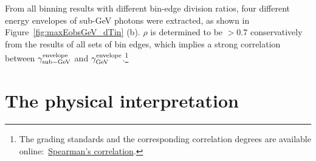 \documentclass[linenumbers,twocolumn]{aastex631}
\begin{document}
From all binning results with different bin-edge division ratios, four different energy envelopes of sub-GeV photons were extracted, as shown in Figure~\ref{fig:maxEobsGeV_dTin} (b). $\rho$ is determined to be $> 0.7$ conservatively from the results of all sets of bin edges, which implies a strong correlation between $\gamma^{\rm envelope}_{\rm sub-GeV}$ and $\gamma^{\rm envelope}_{\rm GeV}$.\footnote{The grading standards and the corresponding correlation degrees are available online:~\href{https://www.statstutor.ac.uk/resources/uploaded/spearmans.pdf}{Spearman's correlation}. }





  

\section{The physical interpretation}\label{sec:physical_interpretation}
\end{document}
